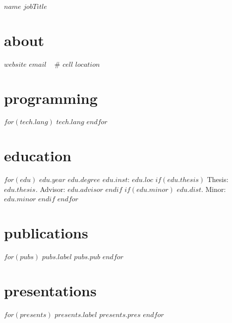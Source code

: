 \documentclass[]{friggeri-cv}
\begin{document}
\header
  {$name$}
  {$jobTitle$}



\begin{aside}
  \section{about}
    \href{http://$website$}{$website$}
    \href{mailto:$email$}{$email$}
    ~
    \# $cell$
    $location$
    \section{programming}
    $for(tech.lang)$
      $tech.lang$
    $endfor$
\end{aside}



\section{education}
\begin{entrylist}
$for(edu)$
  \entry
  {$edu.year$}
  {$edu.degree$}
  {$edu.inst$: $edu.loc$}
  $if(edu.thesis)$
    {Thesis: \textit{$edu.thesis$.} Advisor: $edu.advisor$}
  $endif$
  $if(edu.minor)$
    {$edu.dist$. Minor: $edu.minor$}
  $endif$
$endfor$
\end{entrylist}



\section{publications}
\begin{entrylist}
$for(pubs)$
  \entry
  {$pubs.label$}
  {}
  {}
  {$pubs.pub$}
$endfor$
\end{entrylist}



\section{presentations}
\begin{entrylist}
$for(presents)$
  \entry
  {$presents.label$}
  {}
  {}
  {$presents.pres$}
$endfor$
\end{entrylist}
\end{document}
